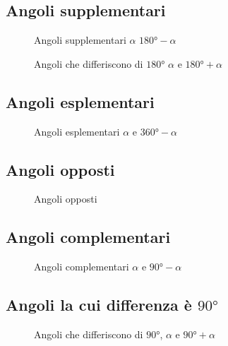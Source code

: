 \subsection{Angoli supplementari}
\begin{figure}
	\centering
	
	\caption{Angoli supplementari $\alpha$ $\ang{180}-\alpha$}
	\label{fig:AngoliAssociatisupplementari}
\end{figure}
\begin{figure}
	\centering
	
	\caption{Angoli che differiscono di $\ang{180}$ $\alpha$ e $\ang{180}+\alpha$}
	\label{fig:AngoliAssociatidiff180}
\end{figure}
\subsection{Angoli esplementari}
\begin{figure} %
	\centering
	
	\caption{Angoli esplementari $\alpha$ e $\ang{360}-\alpha$}
	\label{fig:Angolidif360}
\end{figure}
\subsection{Angoli opposti}
\begin{figure} %
	\centering
	
	\caption{Angoli opposti}
	\label{fig:angoliopposti}
\end{figure}
\subsection{Angoli complementari}
\begin{figure} %
	\centering
	
	\caption{Angoli complementari $\alpha$ e  $\ang{90}-\alpha$}
	\label{fig:angolicomplementari1}
\end{figure}
\subsection{Angoli la cui differenza è $\ang{90}$}
\begin{figure} %
	\centering
	
	\caption{Angoli che differiscono di $\ang{90}$, $\alpha$ e $\ang{90}+\alpha$}
	\label{fig:angolicomplementari2}
\end{figure}
